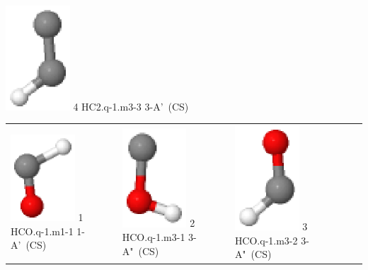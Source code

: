 \documentclass[10pt]{article}
\begin{document}
\begin{tabular}
\includegraphics[width=2.40000000000000000000cm]{HC2.q-1.m3-3.eps} \tiny{4 \hspace{1.20000000000000000000cm} HC2.q-1.m3-3 \hspace{5pt} 3-A'~(CS)} 
\\
\end{tabular}

\vspace{0.5cm}
\begin{tabular}{|
>{\centering\arraybackslash}p{2.40000000000000000000cm}|
>{\centering\arraybackslash}p{2.40000000000000000000cm}|
>{\centering\arraybackslash}p{2.40000000000000000000cm}|
>{\centering\arraybackslash}p{2.40000000000000000000cm}|
>{\centering\arraybackslash}p{2.40000000000000000000cm}|
}
\hline
\multicolumn{4}{|c|}{HCO} \\\hline
\includegraphics[width=2.40000000000000000000cm]{HCO.q-1.m1-1.eps} \tiny{1 \hspace{1.20000000000000000000cm} HCO.q-1.m1-1 \hspace{5pt} 1-A'~(CS)} &
\includegraphics[width=2.40000000000000000000cm]{HCO.q-1.m3-1.eps} \tiny{2 \hspace{1.20000000000000000000cm} HCO.q-1.m3-1 \hspace{5pt} 3-A"~(CS)} &
\includegraphics[width=2.40000000000000000000cm]{HCO.q-1.m3-2.eps} \tiny{3 \hspace{1.20000000000000000000cm} HCO.q-1.m3-2 \hspace{5pt} 3-A"~(CS)} &

\end{tabular}
\end{document}
